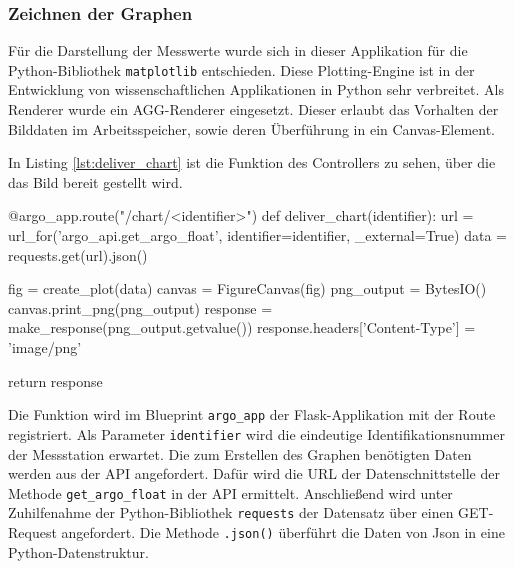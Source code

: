 \subsubsection{Zeichnen der Graphen} \label{sec:ImplementierungPLOTS}


Für die Darstellung der Messwerte wurde sich in dieser Applikation für die Python-Bibliothek \texttt{matplotlib} entschieden.  Diese Plotting-Engine ist in der Entwicklung von wissenschaftlichen Applikationen in Python sehr verbreitet.
Als Renderer wurde ein AGG-Renderer eingesetzt. Dieser erlaubt das Vorhalten der Bilddaten im Arbeitsspeicher, sowie deren Überführung in ein Canvas-Element.

In Listing \ref{lst:deliver_chart} ist die Funktion des \gls{Controller}s zu sehen, über die das Bild bereit gestellt wird.

\begin{python}[label={lst:deliver_chart}, caption={Ausliefern eines Funktionsplots Flask}]
@argo_app.route("/chart/<identifier>")
def deliver_chart(identifier):
    url = url_for('argo_api.get_argo_float', identifier=identifier, _external=True)
    data = requests.get(url).json()

    fig = create_plot(data)
    canvas = FigureCanvas(fig)
    png_output = BytesIO()
    canvas.print_png(png_output)
    response = make_response(png_output.getvalue())
    response.headers['Content-Type'] = 'image/png'

    return response
\end{python}

Die Funktion wird im Blueprint \texttt{argo\_app} der Flask-Applikation mit der Route registriert. Als Parameter \texttt{identifier}  wird die eindeutige Identifikationsnummer der Messstation erwartet. Die zum Erstellen des Graphen benötigten Daten werden aus der \gls{API} angefordert. Dafür wird die URL der Datenschnittstelle der Methode \texttt{get\_argo\_float} in der \gls{API} ermittelt. Anschließend wird unter Zuhilfenahme der Python-Bibliothek \texttt{requests} der Datensatz über einen GET-Request angefordert. Die Methode \texttt{.json()} überführt die Daten von Json in eine Python-Datenstruktur.

